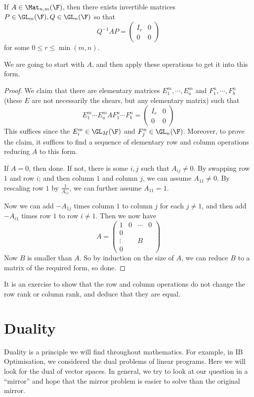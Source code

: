 \documentclass[a4paper]{article}
\begin{document}
\begin{prop}
  If $A\in \Mat_{n, m}(\F)$, then there exists invertible matrices $P \in \GL_m(\F), Q\in \GL_n(\F)$ so that
  \[
    Q^{-1}AP =
    \begin{pmatrix}
      I_r & 0\\
      0 & 0
    \end{pmatrix}
  \]
  for some $0 \leq r \leq \min(m, n)$.
\end{prop}

We are going to start with $A$, and then apply these operations to get it into this form.

\begin{proof}
  We claim that there are elementary matrices $E_1^m, \cdots, E_a^m$ and $F_1^n, \cdots, F_b^n$ (these $E$ are not necessarily the shears, but any elementary matrix) such that
  \[
    E_1^m \cdots E_a^m AF_1^n \cdots F_b^n =
    \begin{pmatrix}
      I_r & 0\\
      0 & 0
    \end{pmatrix}
  \]
  This suffices since the $E_i^m \in \GL_M(\F)$ and $F_j^n \in \GL_n(\F)$. Moreover, to prove the claim, it suffices to find a sequence of elementary row and column operations reducing $A$ to this form.

  If $A = 0$, then done. If not, there is some $i, j$ such that $A_{ij} \not= 0$. By swapping row $1$ and row $i$; and then column $1$ and column $j$, we can assume $A_{11} \not= 0$. By rescaling row $1$ by $\frac{1}{A_{11}}$, we can further assume $A_{11} = 1$.

  Now we can add $-A_{1j}$ times column $1$ to column $j$ for each $j \not= 1$, and then add $-A_{i1}$ times row $1$ to row $i \not= 1$. Then we now have
  \[
    A =
    \begin{pmatrix}
      1 & 0 & \cdots & 0\\
      0 \\
      \vdots & & B\\
      0 &
    \end{pmatrix}
  \]
  Now $B$ is smaller than $A$. So by induction on the size of $A$, we can reduce $B$ to a matrix of the required form, so done.
\end{proof}
It is an exercise to show that the row and column operations do not change the row rank or column rank, and deduce that they are equal.

\section{Duality}
Duality is a principle we will find throughout mathematics. For example, in IB Optimisation, we considered the dual problems of linear programs. Here we will look for the dual of vector spaces. In general, we try to look at our question in a ``mirror'' and hope that the mirror problem is easier to solve than the original mirror.
\end{document}
